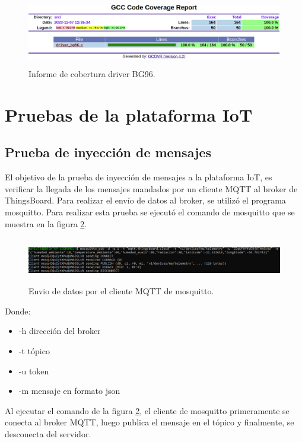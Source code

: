 \begin{figure}[h!]
    \centering
      \includegraphics[width=\linewidth, height=3cm]{./Figures/cobertura_bg96_2.png}
    \caption{Informe de cobertura driver BG96.}
      \label{fig:Cobertura BG96}
\end{figure}

\section{Pruebas de la plataforma IoT}
\subsection{Prueba de inyección de mensajes}
El objetivo de la prueba de inyección de mensajes a la plataforma IoT, es verificar la llegada de los mensajes mandados por un cliente MQTT al broker de ThingsBoard.
Para realizar el envío de datos al broker, se utilizó el programa mosquitto. Para realizar esta prueba se ejecutó el comando de mosquitto que se muestra en la figura \ref{fig:mosquitto pub}.

\begin{figure}[h!]
  \centering
    \includegraphics[width=\linewidth, height=2cm]{./Figures/mosquito_enviodatos.png}
  \caption{Envio de datos por el cliente MQTT de mosquitto.}
    \label{fig:mosquitto pub}
\end{figure}

Donde:
\begin{itemize}
  \item -h dirección del broker
  \item -t tópico 
  \item -u token
  \item -m mensaje en formato json
\end{itemize}

Al ejecutar el comando de la figura \ref{fig:mosquitto pub}, el cliente de mosquitto primeramente se conecta al broker MQTT, luego publica el mensaje en el tópico y finalmente, se desconecta del servidor.

